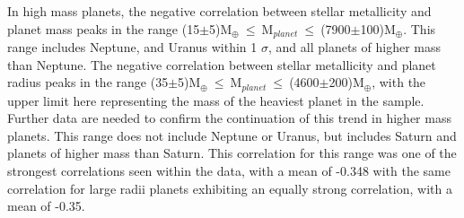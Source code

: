 \documentclass[a4paper,twocolumn,12pt]{article}
\begin{document}
In high mass planets, the negative correlation between stellar metallicity and planet mass peaks in the range (15$\pm$5)M$_{\oplus}~\leq~$M$_{planet}~\leq~$(7900$\pm$100)M$_{\oplus}$. This range includes Neptune, and Uranus within 1 $\sigma$, and all planets of higher mass than Neptune. The negative correlation between stellar metallicity and planet radius peaks in the range (35$\pm$5)M$_{\oplus}~\leq~$M$_{planet}~\leq~$(4600$\pm$200)M$_{\oplus}$, with the upper limit here representing the mass of the heaviest planet in the sample. Further data are needed to confirm the continuation of this trend in higher mass planets. This range does not include Neptune or Uranus, but includes Saturn and planets of higher mass than Saturn. This correlation for this range was one of the strongest correlations seen within the data, with a mean of -0.348 with the same correlation for large radii planets exhibiting an equally strong correlation, with a mean of -0.35.
\end{document}
